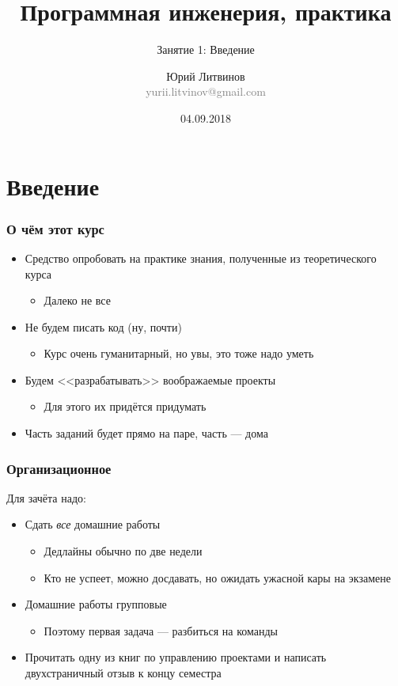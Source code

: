 \documentclass[xetex,mathserif,serif]{beamer}
\title{Программная инженерия, практика}
\subtitle{Занятие 1: Введение}
\author[Юрий Литвинов]{Юрий Литвинов\\\small{\textcolor{gray}{yurii.litvinov@gmail.com}}}
\date{04.09.2018}
\begin{document}
	\frame{\titlepage}

	\section{Введение}

	\begin{frame}
		\frametitle{О чём этот курс}
		\begin{itemize}
			\item Средство опробовать на практике знания, полученные из теоретического курса
			\begin{itemize}
				\item Далеко не все
			\end{itemize}
			\item Не будем писать код (ну, почти)
			\begin{itemize}
				\item Курс очень гуманитарный, но увы, это тоже надо уметь
			\end{itemize}
			\item Будем <<разрабатывать>> воображаемые проекты
			\begin{itemize}
				\item Для этого их придётся придумать
			\end{itemize}
			\item Часть заданий будет прямо на паре, часть --- дома
		\end{itemize}
	\end{frame}

	\begin{frame}
		\frametitle{Организационное}
		Для зачёта надо:
		\begin{itemize}
			\item Сдать \emph{все} домашние работы
			\begin{itemize}
				\item Дедлайны обычно по две недели
				\item Кто не успеет, можно досдавать, но ожидать ужасной кары на экзамене
			\end{itemize}
			\item Домашние работы групповые
			\begin{itemize}
				\item Поэтому первая задача --- разбиться на команды
			\end{itemize}
			\item Прочитать одну из книг по управлению проектами и написать двухстраничный отзыв к концу семестра
		\end{itemize}
	\end{frame}
\end{document}
